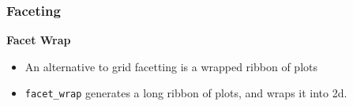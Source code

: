 \documentclass{beamer}
\begin{document}
\begin{frame}
	\frametitle{Faceting}
\Large
\vspace{-1cm}
\noindent \textbf{Facet Wrap}
\begin{itemize}
\item An alternative to grid facetting is a wrapped ribbon of plots
\item \texttt{facet\_wrap} generates a long ribbon of plots, and wraps it into 2d.
\end{itemize}

\end{frame}
%
%
\end{document}
